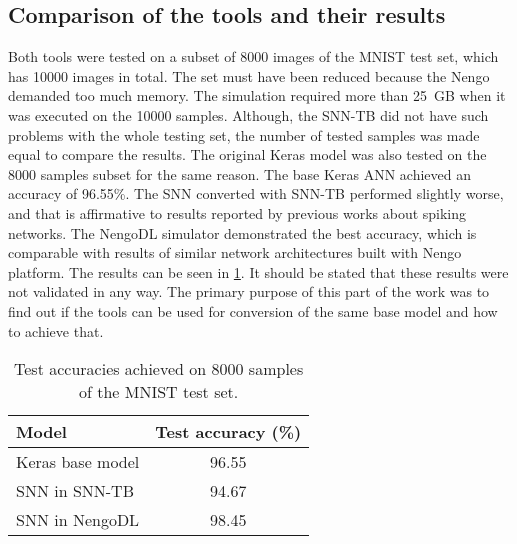 \subsection{Comparison of the tools and their results}
Both tools were tested on a subset of 8000 images of the MNIST test set, which has 10000 images in total. The set must have been reduced because the Nengo demanded too much memory. The simulation required more than 25~GB when it was executed on the 10000 samples. Although, the SNN-TB did not have such problems with the whole testing set, the number of tested samples was made equal to compare the results. The original Keras model was also tested on the 8000 samples subset for the same reason. The base Keras ANN achieved an accuracy of 96.55\%. The SNN converted with SNN-TB performed slightly worse, and that is affirmative to results reported by previous works about spiking networks. The NengoDL simulator demonstrated the best accuracy, which is comparable with results of similar network architectures built with Nengo platform. The results can be seen in \cref{tab:MNIST_results}. It should be stated that these results were not validated in any way. The primary purpose of this part of the work was to find out if the tools can be used for conversion of the same base model and how to achieve that.

\begin{table}[htbp]
    \centering
    \begin{tabularx}{\linewidth}{>{\raggedright\arraybackslash}Xc}
    \toprule
        Model & Test accuracy (\%) \\
    \midrule
        Keras base model & 96.55 \\
        SNN in SNN-TB & 94.67 \\
        SNN in NengoDL & 98.45 \\
    \bottomrule
    \end{tabularx}
    \caption{Test accuracies achieved on 8000 samples of the MNIST test set.}
    \label{tab:MNIST_results}
\end{table}

